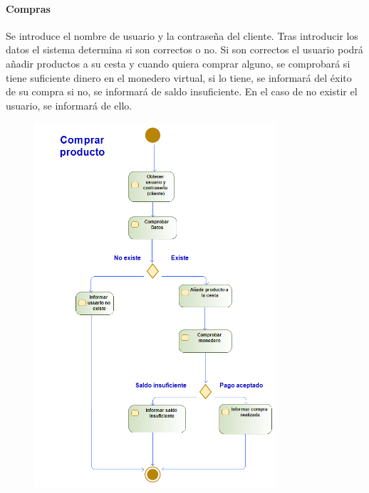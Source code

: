 \paragraph{Compras}
Se introduce el nombre de usuario y la contraseña del cliente. Tras introducir los datos el sistema determina si son correctos o no. Si son correctos el usuario podrá añadir productos a su cesta y cuando quiera comprar alguno, se comprobará si tiene suficiente dinero en el monedero virtual, si lo tiene, se informará del éxito de su compra si no, se informará de saldo insuficiente. En el caso de no existir el usuario, se informará de ello.
\begin{figure}[H]
    \centering
    \includegraphics[width=0.8\textwidth]{Use_Cases/comprar_producto.png}
\end{figure}
